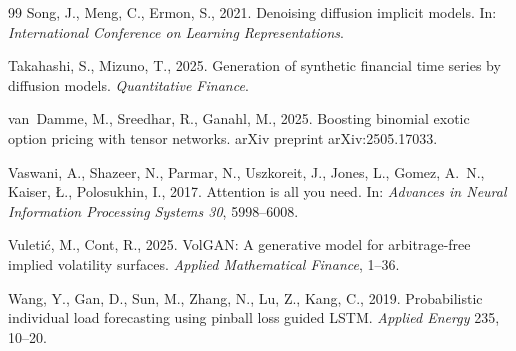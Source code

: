 \documentclass[12pt,letterpaper]{article}
\begin{document}
\begin{thebibliography}{99}
Song, J., Meng, C., Ermon, S., 2021. Denoising diffusion implicit models.
In: \emph{International Conference on Learning Representations}.

Takahashi, S., Mizuno, T., 2025. Generation of synthetic financial time
series by diffusion models. \emph{Quantitative Finance}.

van~Damme, M., Sreedhar, R., Ganahl, M., 2025. Boosting binomial exotic
option pricing with tensor networks. arXiv preprint arXiv:2505.17033.

Vaswani, A., Shazeer, N., Parmar, N., Uszkoreit, J., Jones, L., Gomez,
A.~N., Kaiser, {\L}., Polosukhin, I., 2017. Attention is all you need. In:
\emph{Advances in Neural Information Processing Systems 30}, 5998--6008.

Vuleti\'c, M., Cont, R., 2025. VolGAN: A generative model for
arbitrage-free implied volatility surfaces. \emph{Applied Mathematical
Finance}, 1--36.

Wang, Y., Gan, D., Sun, M., Zhang, N., Lu, Z., Kang, C., 2019.
Probabilistic individual load forecasting using pinball loss guided LSTM.
\emph{Applied Energy} 235, 10--20.

\end{thebibliography}
\end{document}

